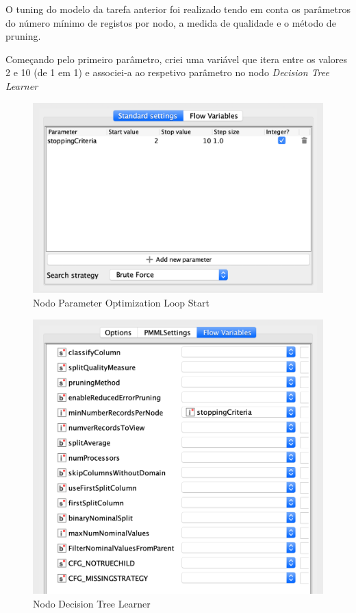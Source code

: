 O tuning do modelo da tarefa anterior foi realizado tendo em conta os parâmetros do número mínimo de registos por nodo, a medida de qualidade
e o método de pruning.

Começando pelo primeiro parâmetro, criei uma variável que itera entre os valores 2 e 10 (de 1 em 1) e associei-a ao respetivo parâmetro no nodo \textit{Decision Tree Learner}

\begin{figure}[H]
    \centering
    \includegraphics[scale=0.4]{Images/T4_a1.png}
    \caption{Nodo Parameter Optimization Loop Start}
\end{figure}

\begin{figure}[H]
    \centering
    \includegraphics[scale=0.4]{Images/T4_a2.png}
    \caption{Nodo Decision Tree Learner}
\end{figure}

